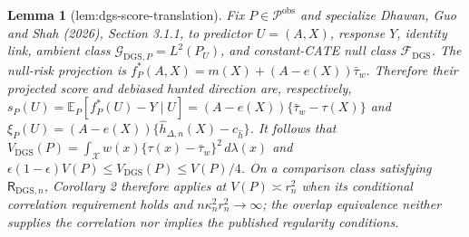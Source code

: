 \documentclass{article}
\newtheorem{lemma}{Lemma}
\begin{document}
\begin{lemma}[lem:dgs-score-translation]\label{lem:dgs-score-translation}
Fix \(P\in\mathcal P^{\mathrm{obs}}\) and specialize Dhawan, Guo and Shah (2026), Section 3.1.1, to predictor \(U=(A,X)\), response \(Y\), identity link, ambient class \(\mathcal G_{\mathrm{DGS},P}=L^2(P_U)\), and constant-CATE null class \(\mathcal F_{\mathrm{DGS}}\). The null-risk projection is \(f_P^*(A,X)=m(X)+(A-e(X))\bar\tau_w\). Therefore their projected score and debiased hunted direction are, respectively, \(s_P(U)=\mathbb E_P[f_P^*(U)-Y\mid U]=(A-e(X))\{\bar\tau_w-\tau(X)\}\) and \(\xi_P(U)=(A-e(X))\{\widehat h_{\Delta,n}(X)-c_{\widehat h}\}\). It follows that \(V_{\mathrm{DGS}}(P)=\int_{\mathcal X}w(x)\{\tau(x)-\bar\tau_w\}^2\,d\lambda(x)\) and \(\epsilon(1-\epsilon)V(P)\le V_{\mathrm{DGS}}(P)\le V(P)/4\). On a comparison class satisfying \(\mathsf R_{\mathrm{DGS},n}\), Corollary 2 therefore applies at \(V(P)\asymp r_n^2\) when its conditional correlation requirement holds and \(n\kappa_n^2r_n^2\to\infty\); the overlap equivalence neither supplies the correlation nor implies the published regularity conditions.
\end{lemma}
\end{document}
